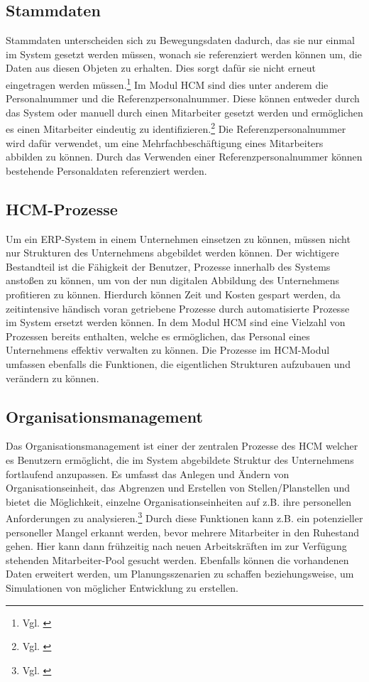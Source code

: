 \subsection{Stammdaten}
Stammdaten unterscheiden sich zu Bewegungsdaten dadurch, das sie nur einmal im System gesetzt werden müssen, wonach sie referenziert werden können um, die Daten aus diesen Objeten zu erhalten. Dies sorgt dafür sie nicht erneut eingetragen werden müssen.\footnote{Vgl. \cite{SSSUM2019a}}
Im Modul HCM sind dies unter anderem die Personalnummer und die Referenzpersonalnummer.
Diese können entweder durch das System oder manuell durch einen Mitarbeiter gesetzt werden und ermöglichen es einen Mitarbeiter eindeutig zu identifizieren.\footnote{Vgl. \cite{SSSUM2019a}}
Die Referenzpersonalnummer wird dafür verwendet, um eine Mehrfachbeschäftigung eines Mitarbeiters abbilden zu können.
Durch das Verwenden einer Referenzpersonalnummer können bestehende Personaldaten referenziert werden.
\subsection{HCM-Prozesse}
Um ein ERP-System in einem Unternehmen einsetzen zu können, müssen nicht nur Strukturen des Unternehmens abgebildet werden können.
Der wichtigere Bestandteil ist die Fähigkeit der Benutzer, Prozesse innerhalb des Systems anstoßen zu können, um von der nun digitalen Abbildung des Unternehmens profitieren zu können.
Hierdurch können Zeit und Kosten gespart werden, da zeitintensive händisch voran getriebene Prozesse durch automatisierte Prozesse im System ersetzt werden können.
In dem Modul HCM sind eine Vielzahl von Prozessen bereits enthalten, welche es ermöglichen, das Personal eines Unternehmens effektiv verwalten zu können.
Die Prozesse im HCM-Modul umfassen ebenfalls die Funktionen, die eigentlichen Strukturen aufzubauen und verändern zu können.

\subsection{Organisationsmanagement}
Das Organisationsmanagement ist einer der zentralen Prozesse des HCM welcher es Benutzern ermöglicht, die im System abgebildete Struktur des Unternehmens fortlaufend anzupassen.
Es umfasst das Anlegen und Ändern von Organisationseinheit, das Abgrenzen und Erstellen von Stellen/Planstellen und bietet die Möglichkeit, einzelne Organisationseinheiten auf z.B. ihre personellen Anforderungen zu analysieren.\footnote{Vgl. \cite{SSSUM2019a}}
Durch diese Funktionen kann z.B. ein potenzieller personeller Mangel erkannt werden, bevor mehrere Mitarbeiter in den Ruhestand gehen. Hier kann dann frühzeitig nach neuen Arbeitskräften im zur Verfügung stehenden Mitarbeiter-Pool gesucht werden.
Ebenfalls können die vorhandenen Daten erweitert werden, um Planungsszenarien zu schaffen beziehungsweise, um Simulationen von möglicher Entwicklung zu erstellen.

